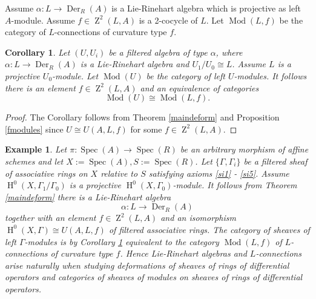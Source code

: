 \documentclass{amsart}
\theoremstyle{plain}
\newtheorem{corollary}[theorem]{Corollary}
\newtheorem{example}[theorem]{Example}
\theoremstyle{definition}
\theoremstyle{remark}
\numberwithin{equation}{theorem}
\begin{document}
Assume $\alpha:L\rightarrow {\operatorname{Der} }_{R}({A})$ is a Lie-Rinehart algebra which is projective as left ${A}$-module.
Assume $f\in {\operatorname{Z}}^2(L,{A})$ is a 2-cocycle of $L$. Let ${\operatorname{Mod}}(L,f)$ be the category of $L$-connections of curvature type
$f$.

\begin{corollary} \label{modules} Let $(U,U_i)$ be a filtered algebra of type $\alpha$, where $\alpha:L\rightarrow {\operatorname{Der} }_R(A)$
is a Lie-Rinehart algebra and $U_1/U_0\cong L$. Assume $L$ is a projective $U_0$-module. Let ${\operatorname{Mod}}(U)$ be the category 
of left $U$-modules. It follows there is an element $f\in {\operatorname{Z}}^2(L,{A})$  and an equivalence of categories
\[ {\operatorname{Mod}}(U)\cong {\operatorname{Mod}}(L,f) .\]
\end{corollary}
\begin{proof} The Corollary follows from Theorem \ref{maindeform} and Proposition \ref{fmodules}
since $U\cong U({A},L,f)$ for some $f\in {\operatorname{Z}}^2(L,{A})$.
\end{proof}

\begin{example} 

Let $\pi:{\operatorname{Spec} }({A})\rightarrow {\operatorname{Spec} }({R})$ be an arbitrary morphism of affine schemes and let $X:={\operatorname{Spec} }({A}), S:={\operatorname{Spec} }({R})$.
Let $\{\Gamma, \Gamma_i\}$ be
a filtered sheaf of associative rings on $X$ relative to $S$ satisfying axioms \ref{si1} - \ref{si5}. 
Assume ${\operatorname{H} }^0(X, \Gamma_1/\Gamma_0)$ is a projective ${\operatorname{H} }^0(X,\Gamma_0)$-module. It follows from Theorem
\ref{maindeform} there is a Lie-Rinehart algebra
\[ \alpha:L\rightarrow {\operatorname{Der} }_{R}({A}) \]
together with an element $f\in {\operatorname{Z}}^2(L,{A})$ and an isomorphism ${\operatorname{H} }^0(X, \Gamma)\cong U({A},L,f)$ of filtered associative rings.
The category of sheaves of left $\Gamma$-modules is by Corollary \ref{modules} equivalent to the category ${\operatorname{Mod}}(L,f)$ of
$L$-connections of curvature type $f$.
Hence Lie-Rinehart algebras and $L$-connections arise naturally when studying deformations of
sheaves of rings of differential operators and categories of sheaves of modules on sheaves of rings of differential operators. 
\end{example}
\end{document}

